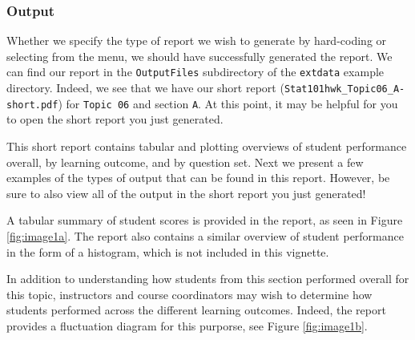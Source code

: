 \documentclass{article}\usepackage[]{graphicx}\usepackage[]{color}
\numberwithin{equation}{section} %
\begin{document}
\subsubsection{Output}

Whether we specify the type of report we wish to generate by hard-coding or selecting from the menu, we should have successfully generated the report. We can find our report in the \texttt{OutputFiles} subdirectory of the \texttt{extdata} example directory. Indeed, we see that we have our short report (\texttt{Stat101hwk\_Topic06\_A-short.pdf}) for \texttt{Topic 06} and section \texttt{A}. At this point, it may be helpful for you to open the short report you just generated.

This short report contains tabular and plotting overviews of student performance overall, by learning outcome, and by question set. Next we present a few examples of the types of output that can be found in this report. However, be sure to also view all of the output in the short report you just generated!

A tabular summary of student scores is provided in the report, as seen in Figure \ref{fig:image1a}. The report also contains a similar overview of student performance in the form of a histogram, which is not included in this vignette.

\begin{center}
\captionsetup{width=0.65\textwidth}
\label{fig:image1a}
\end{center}

In addition to understanding how students from this section performed overall for this topic, instructors and course coordinators may wish to determine how students performed across the different learning outcomes. Indeed, the report provides a fluctuation diagram for this purporse, see Figure \ref{fig:image1b}.
\end{document}

